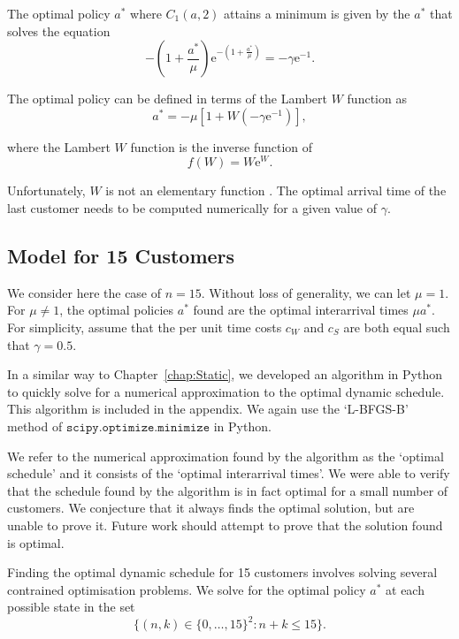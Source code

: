 The optimal policy $a^{*}$ where $C_{1} (a, 2)$ attains a minimum is given by the $a^{*}$ that solves the equation
\begin{equation}
	- \left( 1 + \frac{a^{*}}{\mu} \right) \mathrm{e}^{- \left( 1 + \frac{a^{*}}{\mu} \right)} = - \gamma \mathrm{e}^{-1}.
\end{equation}

The optimal policy can be defined in terms of the Lambert $W$ function as
\begin{equation}
	a^{*} = - \mu \left[ 1 + W \left( - \gamma \mathrm{e}^{-1} \right) \right],
\end{equation}

where the Lambert $W$ function is the inverse function of
\begin{equation}
	f (W) = W \mathrm{e}^{W}.
\end{equation}

Unfortunately, $W$ is not an elementary function \citep{Chow}. The optimal arrival time of the last customer needs to be computed numerically for a given value of $\gamma$.

\subsection{Model for 15 Customers}
We consider here the case of $n = 15$. Without loss of generality, we can let $\mu = 1$. For $\mu \neq 1$, the optimal policies $a^{*}$ found are the optimal interarrival times $\mu a^{*}$. For simplicity, assume that the per unit time costs $c_{W}$ and $c_{S}$ are both equal such that $\gamma = 0.5$.

In a similar way to Chapter~\ref{chap:Static}, we developed an algorithm in Python to quickly solve for a numerical approximation to the optimal dynamic schedule. This algorithm is included in the appendix. We again use the `L-BFGS-B' method of $\texttt{scipy.optimize.minimize}$ in Python.

We refer to the numerical approximation found by the algorithm as the `optimal schedule' and it consists of the `optimal interarrival times'. We were able to verify that the schedule found by the algorithm is in fact optimal for a small number of customers. We conjecture that it always finds the optimal solution, but are unable to prove it. Future work should attempt to prove that the solution found is optimal.

Finding the optimal dynamic schedule for 15 customers involves solving several contrained optimisation problems. We solve for the optimal policy $a^{*}$ at each possible state in the set
\begin{equation}
	\Big\{ (n, k) \in \{ 0, \ldots, 15 \}^{2} : n + k \leq 15 \Big\}.
\end{equation}

